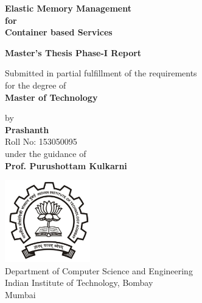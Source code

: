 \documentclass[11pt,a4paper,openright]{report}
\newcommand{\putiitblogo}{\includegraphics[width=10em]{iitb-black}}
\begin{document}
  \begin{titlepage}    
    \begin{center}
   
      \Large \textbf{Elastic Memory Management \\for \\Container based Services}  \\
      \vspace{5em}
      
      \large \textbf{Master's Thesis Phase-I Report} \\
      \vspace{5em}
      
      \normalsize Submitted in partial fulfillment of the requirements \\ for the degree of \\
      \vspace{1em}      
      \large \textbf{Master of Technology} \\
      \vspace{5em}
      
      \normalsize by \\
      \vspace{1em}      
      \large \textbf{Prashanth} \\ 
      \vspace{0.5em}
      \normalsize Roll No: 153050095 \\
      
      \vspace{5em}
      \normalsize under the guidance of \\
      \vspace{0.5em}      
      \large \textbf{Prof. Purushottam Kulkarni} \\
      \vspace{5em}
      
      \putiitblogo \\
      \Large 
      Department of Computer Science and Engineering \\
      Indian Institute of Technology, Bombay \\
      Mumbai
      
    \end{center}
  \end{titlepage} 
  
  
  \tableofcontents
  \listoftables
  \listoffigures
  \cleardoublepage
  \setcounter{page}{1}
  \setlength{\parskip}{1em}
  
    
    
  
  
  
    
  
\end{document}
